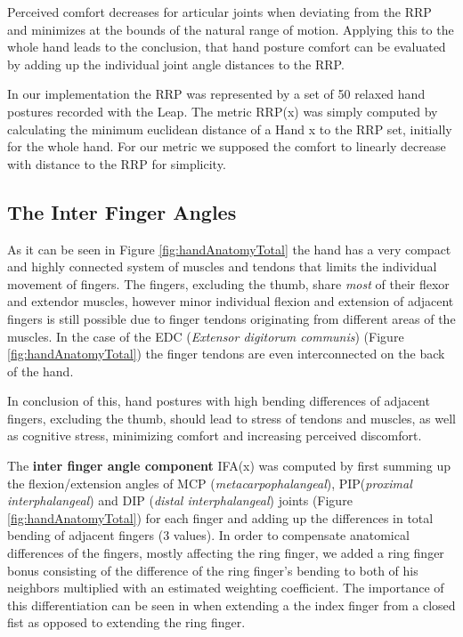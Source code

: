 \documentclass{sig-alternate-05-2015}
\begin{document}
Perceived comfort decreases for articular joints when deviating from the RRP and minimizes at the bounds of the natural range of motion. Applying this to the whole hand leads to the conclusion, that hand posture comfort can be evaluated by adding up the individual joint angle distances to the RRP. \cite{naddeo2015proposal}

In our implementation the RRP was represented by a set of 50 relaxed hand postures recorded with the Leap. The metric RRP(x) was simply computed by calculating the minimum euclidean distance of a Hand x to the RRP set, initially for the whole hand. 
For our metric we supposed the comfort to linearly decrease with distance to the RRP for simplicity.

\subsection{The Inter Finger Angles}

As it can be seen in Figure \ref{fig:handAnatomyTotal}
the hand has a very compact and highly connected system of muscles and tendons that limits the individual movement of fingers.
The fingers, excluding the thumb, share \textsl{most} of their flexor and extendor muscles, however minor individual flexion and extension of adjacent fingers is still possible due to finger tendons originating from different areas of the muscles. In the case of the EDC (\textit{Extensor digitorum communis}) (Figure \ref{fig:handAnatomyTotal}) the finger tendons are even interconnected on the back of the hand. 

In conclusion of this, hand postures with high bending differences of adjacent fingers, excluding the thumb, should lead to stress of tendons and muscles, as well as cognitive stress, minimizing comfort and increasing perceived discomfort.

The \textbf{inter finger angle component} IFA(x) was computed by first summing up the flexion/extension angles of MCP (\textit{metacarpophalangeal}), PIP(\textit{proximal interphalangeal}) and DIP (\textit{distal interphalangeal}) joints (Figure \ref{fig:handAnatomyTotal}) for each finger and adding up the differences in total bending of adjacent fingers (3 values). In order to compensate anatomical differences of the fingers, mostly affecting the ring finger, we added a ring finger bonus consisting of the difference of the ring finger's bending to both of his neighbors multiplied with an estimated weighting coefficient. The importance of this differentiation can be seen in when extending a the index finger from a closed fist as opposed to extending the ring finger. 
\end{document}

